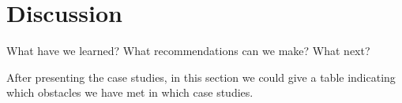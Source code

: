 \section{Discussion}
\label{s:discussion}

What have we learned? What recommendations can we make? What next?

After presenting the case studies, in this section we could give a table indicating
which obstacles we have met in which case studies.
